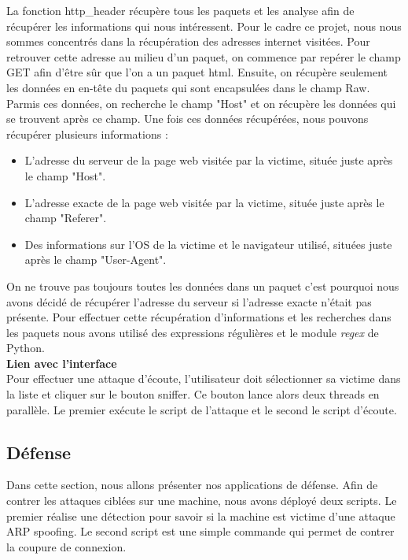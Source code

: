 \documentclass[11pt]{article}
\begin{document}
La fonction http\_header récupère tous les paquets et les analyse afin de récupérer les informations qui nous intéressent. Pour le cadre ce projet, nous nous sommes concentrés dans la récupération des adresses internet visitées. Pour retrouver cette adresse au milieu d'un paquet, on commence par repérer le champ GET afin d'être sûr que l'on a un paquet html. Ensuite, on récupère seulement les données en en-tête du paquets qui sont encapsulées dans le champ Raw.  Parmis ces données, on recherche le champ "Host" et on récupère les données qui se trouvent après ce champ. 
Une fois ces données récupérées, nous pouvons récupérer plusieurs informations : 
\begin{itemize}
\item L'adresse du serveur de la page web visitée par la victime, située juste après le champ "Host".
\item L'adresse exacte de la page web visitée par la victime, située juste après le champ "Referer".
\item Des informations sur l'OS de la victime et le navigateur utilisé, situées juste après le champ "User-Agent".
\end{itemize}
On ne trouve pas toujours toutes les données dans un paquet c'est pourquoi nous avons décidé de récupérer l'adresse du serveur si l'adresse exacte n'était pas présente. Pour effectuer cette récupération d'informations et les recherches dans les paquets nous avons utilisé des expressions régulières et le module \textit{regex} de Python.
 ~\\


\textbf{Lien avec l'interface}~\\

Pour effectuer une attaque d'écoute, l'utilisateur doit sélectionner sa victime dans la liste et cliquer sur le bouton sniffer. Ce bouton lance alors deux threads en parallèle. Le premier exécute le script de l'attaque et le second le script d'écoute.



\subsection{Défense}
Dans cette section, nous allons présenter nos applications de défense.
Afin de contrer les attaques ciblées sur une machine, nous avons déployé deux scripts. Le premier réalise une détection pour savoir si la machine est victime d'une attaque ARP spoofing. Le second script est une simple commande qui permet de contrer la coupure de connexion. ~\\
\end{document}
